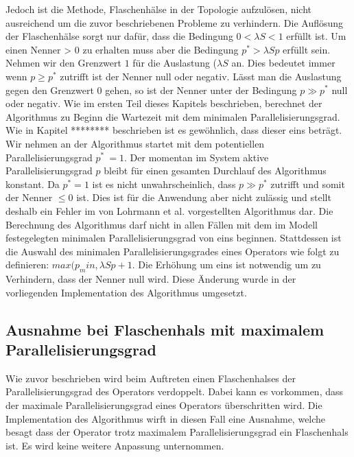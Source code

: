 Jedoch ist die Methode, Flaschenhälse in der Topologie aufzulösen, nicht ausreichend um die zuvor beschriebenen Probleme zu verhindern.
Die Auflösung der Flaschenhälse sorgt nur dafür, dass die Bedingung \( 0 < \lambda S < 1 \) erfüllt ist.
Um einen Nenner > 0 zu erhalten muss aber die Bedingung \(p^\ast > \lambda S p\) erfüllt sein.
Nehmen wir den Grenzwert \(1\) für die Auslastung (\(\lambda S\) an.
Dies bedeutet immer wenn \(p \geq p^\ast\) zutrifft ist der Nenner null oder negativ.
Lässt man die Auslastung gegen den Grenzwert \(0\) gehen, so ist der Nenner unter der Bedingung \(p \gg p^\ast\) null oder negativ.
Wie im ersten Teil dieses Kapitels beschrieben, berechnet der Algorithmus zu Beginn die Wartezeit mit dem minimalen Parallelisierungsgrad.
Wie in Kapitel ******** beschrieben ist es gewöhnlich, dass dieser eins beträgt.
Wir nehmen an der Algorithmus startet mit dem potentiellen Parallelisierungsgrad \(p^\ast\ = 1\).
Der momentan im System aktive Parallelisierungsgrad \(p\) bleibt für einen gesamten Durchlauf des Algorithmus konstant.
Da \(p^\ast = 1\) ist es nicht unwahrscheinlich, dass \(p \gg p^\ast\) zutrifft und somit der Nenner \(\leq 0\) ist.
Dies ist für die Anwendung aber nicht zulässig und stellt deshalb ein Fehler im von Lohrmann et al. vorgestellten Algorithmus dar.
Die Berechnung des Algorithmus darf nicht in allen Fällen mit dem im Modell festegelegten minimalen Parallelisierungsgrad von eins beginnen.
Stattdessen ist die Auswahl des minimalen Parallelisierungsgrades eines Operators wie folgt zu definieren: \(max(p_min, \lambda S p + 1\).
Die Erhöhung um eins ist notwendig um zu Verhindern, dass der Nenner null wird.
Diese Änderung wurde in der vorliegenden Implementation des Algorithmus umgesetzt.

\subsection{Ausnahme bei Flaschenhals mit maximalem Parallelisierungsgrad}
Wie zuvor beschrieben wird beim Auftreten einen Flaschenhalses der Parallelisierungsgrad des Operators verdoppelt. 
Dabei kann es vorkommen, dass der maximale Parallelisierungsgrad eines Operators überschritten wird. 
Die Implementation des Algorithmus wirft in diesen Fall eine Ausnahme, welche besagt dass der Operator trotz maximalem Parallelisierungsgrad ein Flaschenhals ist.
Es wird keine weitere Anpassung unternommen.

